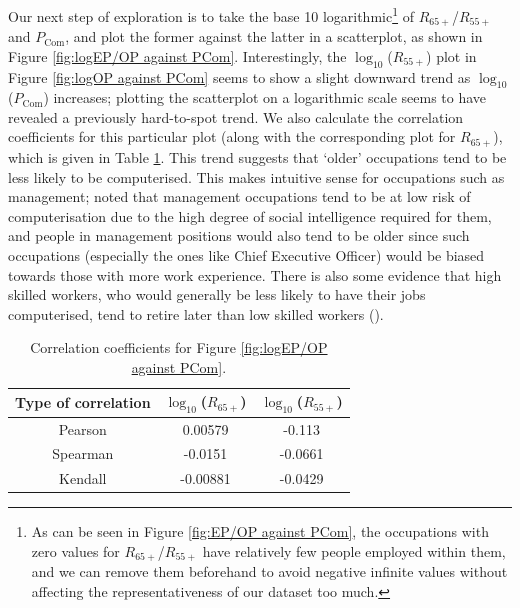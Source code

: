 \documentclass[11pt]{article}
\begin{document}
Our next step of exploration is to take the base 10 logarithmic\footnote{As can be seen in Figure \ref{fig:EP/OP against PCom}, the occupations with zero values for $R_{65+}$/$R_{55+}$ have relatively few people employed within them, and we can remove them beforehand to avoid negative infinite values without affecting the representativeness of our dataset too much.} of $R_{65+}$/$R_{55+}$ and $P_{\text{Com}}$, and plot the former against the latter in a scatterplot, as shown in Figure \ref{fig:logEP/OP against PCom}. Interestingly, the $\log_{10}$($R_{55+}$) plot in Figure \ref{fig:logOP against PCom} seems to show a slight downward trend as $\log_{10}$($P_{\text{Com}}$) increases; plotting the scatterplot on a logarithmic scale seems to have revealed a previously hard-to-spot trend. We also calculate the correlation coefficients for this particular plot (along with the corresponding plot for $R_{65+}$), which is given in Table \ref{tab:logcorrelation}. This trend suggests that `older' occupations tend to be less likely to be computerised. This makes intuitive sense for occupations such as management; \cite{osborne2017future} noted that management occupations tend to be at low risk of computerisation due to the high degree of social intelligence required for them, and people in management positions would also tend to be older since such occupations (especially the ones like Chief Executive Officer) would be biased towards those with more work experience. There is also some evidence that high skilled workers, who would generally be less likely to have their jobs computerised, tend to retire later than low skilled workers (\cite{HimmelreicherRalfK.2009Saao}).


\begin{table}[]
\centering
\begin{tabular}{@{}ccc@{}}
\toprule
\textbf{Type of correlation} & \textbf{$\log_{10}$($R_{65+}$)} & \textbf{$\log_{10}$($R_{55+}$)} \\ \midrule
Pearson                      & 0.00579    & -0.113     \\
Spearman                     & -0.0151     & -0.0661     \\
Kendall                      & -0.00881    & -0.0429    \\ \bottomrule
\end{tabular}
\caption{Correlation coefficients for Figure \ref{fig:logEP/OP against PCom}.}
\label{tab:logcorrelation}
\end{table}
\end{document}
